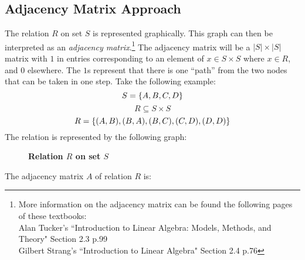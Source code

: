 \subsection{Adjacency Matrix Approach}
The relation \(R\) on set \(S\) is represented graphically. This graph can then be interpreted as an \emph{adjacency matrix}.\footnote{More information on the adjacency
matrix can be found the following pages of these textbooks:\\Alan Tucker's ``Introduction to Linear Algebra: Models, Methods, and Theory" Section 2.3 p.99\\
Gilbert Strang's ``Introduction to Linear Algebra" Section 2.4 p.76} The adjacency matrix will be a \(|S|\times|S|\) matrix with \(1\) in entries corresponding to an 
element of \(x\in S\times S\) where \(x\in R\), and \(0\) elsewhere. The \(1\)s represent that there is one ``path'' from the two nodes that can be taken in one step. 
Take the following example:
\[S=\{A,B,C,D\}\]
\[R\subseteq S\times S\]
\[R=\{(A,B),(B,A),(B,C),(C,D),(D,D)\}\]
The relation is represented by the following graph:
\begin{figure}[H]
    \centering
    \textbf{Relation \(R\) on set \(S\)}

\end{figure}
The adjacency matrix \(A\) of relation \(R\) is:
